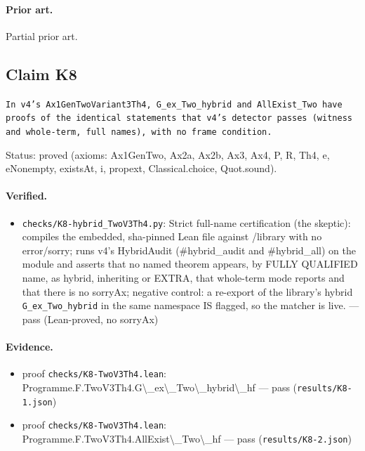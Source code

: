 \documentclass{article}
\begin{document}
\paragraph{Prior art.} Partial prior art.

\subsection*{Claim K8}

\texttt{In v4's Ax1GenTwoVariant3Th4, G\_ex\_Two\_hybrid and AllExist\_Two have proofs of the identical statements that v4's detector passes (witness and whole-term, full names), with no frame condition.}

Status: proved (axioms: Ax1GenTwo, Ax2a, Ax2b, Ax3, Ax4, P, R, Th4, e, eNonempty, existsAt, i, propext, Classical.choice, Quot.sound).

\paragraph{Verified.}
\begin{itemize}
\item \texttt{checks/K8-hybrid\_TwoV3Th4.py}: Strict full-name certification (the skeptic): compiles the embedded, sha-pinned Lean file against /library with no error/sorry; runs v4's HybridAudit (\#hybrid\_audit and \#hybrid\_all) on the module and asserts that no named theorem appears, by FULLY QUALIFIED name, as hybrid, inheriting or EXTRA, that whole-term mode reports and that there is no sorryAx; negative control: a re-export of the library's hybrid \texttt{G\_ex\_Two\_hybrid} in the same namespace IS flagged, so the matcher is live. --- pass (Lean-proved, no sorryAx)
\end{itemize}

\paragraph{Evidence.}
\begin{itemize}
\item proof \texttt{checks/K8-TwoV3Th4.lean}: Programme.F.TwoV3Th4.G\textbackslash{}\_ex\textbackslash{}\_Two\textbackslash{}\_hybrid\textbackslash{}\_hf --- pass (\texttt{results/K8-1.json})
\item proof \texttt{checks/K8-TwoV3Th4.lean}: Programme.F.TwoV3Th4.AllExist\textbackslash{}\_Two\textbackslash{}\_hf --- pass (\texttt{results/K8-2.json})
\end{itemize}
\end{document}
